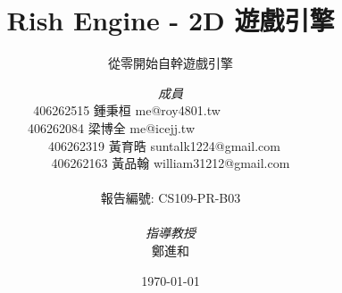 \documentclass[a4paper, 12pt]{report}
\institute{輔仁大學資訊工程學系}
\title{Rish Engine - 2D 遊戲引擎}
\subtitle{從零開始自幹遊戲引擎}
\author{\textit{成員} \\
	406262515 \textsc{鍾秉桓} me@roy4801.tw\ \ \ \ \ \ \ \ \ \ \ \ \ \ \\
    406262084 \textsc{梁博全} me@icejj.tw\ \ \ \ \ \ \ \ \ \ \ \ \ \ \ \ \ \ \  \\
    406262319 \textsc{黃育晧} suntalk1224@gmail.com\ \  \\
    406262163 \textsc{黃品翰} william31212@gmail.com \\
    \ \\
    報告編號: CS109-PR-B03 \\
    \ \\
    \textit{指導教授} \\
    鄭進和
}
\date{\today}
\begin{document}
    \maketitle
    \romantableofcontents

    
    
    
    
    
    

    \printbibliography


\end{document}
